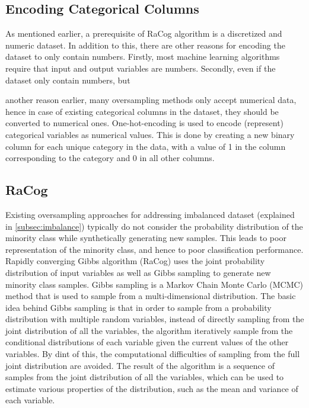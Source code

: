 \documentclass{article}
\begin{document}
\hypertarget{encoding-categorical-columns}{%
\subsection{\texorpdfstring{Encoding Categorical Columns
\label{subsec:encode}}{Encoding Categorical Columns }}\label{encoding-categorical-columns}}

As mentioned earlier, a prerequisite of RaCog algorithm is a discretized
and numeric dataset. In addition to this, there are other reasons for
encoding the dataset to only contain numbers. Firstly, most machine
learning algorithms require that input and output variables are numbers.
Secondly, even if the dataset only contain numbers, but

another reason earlier, many oversampling methods only accept numerical
data, hence in case of existing categorical columns in the dataset, they
should be converted to numerical ones. One-hot-encoding is used to
encode (represent) categorical variables as numerical values. This is
done by creating a new binary column for each unique category in the
data, with a value of 1 in the column corresponding to the category and
0 in all other columns.

\hypertarget{racog}{%
\subsection{\texorpdfstring{RaCog
\label{subsec:racog}}{RaCog }}\label{racog}}

Existing oversampling approaches for addressing imbalanced dataset
(explained in \ref{subsec:imbalance}) typically do not consider the
probability distribution of the minority class while synthetically
generating new samples. This leads to poor representation of the
minority class, and hence to poor classification performance. Rapidly
converging Gibbs algorithm (RaCog) uses the joint probability
distribution of input variables as well as Gibbs sampling to generate
new minority class samples. Gibbs sampling is a Markov Chain Monte Carlo
(MCMC) method \cite{bishop} that is used to sample from a
multi-dimensional distribution. The basic idea behind Gibbs sampling is
that in order to sample from a probability distribution with multiple
random variables, instead of directly sampling from the joint
distribution of all the variables, the algorithm iteratively sample from
the conditional distributions of each variable given the current values
of the other variables. By dint of this, the computational difficulties
of sampling from the full joint distribution are avoided. The result of
the algorithm is a sequence of samples from the joint distribution of
all the variables, which can be used to estimate various properties of
the distribution, such as the mean and variance of each variable.
\end{document}
